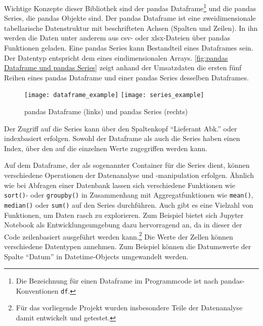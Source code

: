     
    Wichtige Konzepte dieser Bibliothek sind der pandas Dataframe\footnote{Die Bezeichnung für einen Dataframe im Programmcode ist nach pandas-Konventionen \texttt{df}.} und die pandas Series, die pandas Objekte sind. Der pandas Dataframe ist eine zweidimensionale 
    tabellarische Datenstruktur mit beschrifteten Achsen (Spalten und Zeilen). In ihn
    werden die Daten unter anderem aus csv- oder xlsx-Dateien über pandas Funktionen geladen.
    Eine pandas Series kann Bestandteil eines Dataframes sein. Der Datentyp entspricht dem eines eindimensionalen Arrays. 
    \autoref{fig:pandas Dataframe und pandas Series} zeigt anhand der Umsatzdaten die ersten fünf Reihen
    eines pandas Dataframe und einer pandas Series desselben Dataframes. 
    
    
    \begin{figure}[H]
        \centering
            \texttt{[image: dataframe\_example]}
            \hspace{1cm}
            \texttt{[image: series\_example]}
            \caption{pandas Dataframe (links) und pandas Series (rechts)}
            \label{fig:pandas Dataframe und pandas Series}
    \end{figure}

    Der Zugriff auf die Series kann über den Spaltenkopf \enquote{Lieferant Abk.} oder indexbasiert erfolgen. 
    Sowohl der Dataframe als auch die Series haben einen Index, über den auf die einzelnen Werte zugegriffen werden kann. 
    
    Auf dem Dataframe, der als sogenannter Container für die Series dient, können verschiedene Operationen der Datenanalyse und 
    -manipulation erfolgen. Ähnlich wie bei Abfragen einer Datenbank lassen sich verschiedene Funktionen wie \texttt{sort()}- oder \texttt{groupby()}
    in Zusammenhang mit Aggregatfunktionen wie \texttt{mean()}, \texttt{median()} oder \texttt{sum()} auf den Series durchführen.
    Auch gibt es eine Vielzahl von Funktionen, um Daten rasch zu explorieren. Zum Beispiel bietet sich Jupyter Notebook als
    Entwicklungsumgebung dazu hervorragend an, da in dieser der Code zeilenbasiert ausgeführt werden kann.\footnote{Für das vorliegende Projekt wurden 
    insbesondere Teile der Datenanalyse damit entwickelt und getestet.} Die Werte der Zellen können verschiedene Datentypen
    annehmen. Zum Beispiel können die Datumswerte der Spalte \enquote{Datum} in Datetime-Objects umgewandelt werden.

